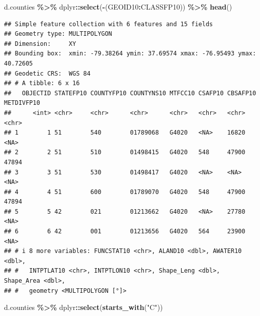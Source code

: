 \documentclass[]{article}
\newenvironment{Shaded}{\begin{snugshade}}{\end{snugshade}}
\newcommand{\FunctionTok}[1]{\textcolor[rgb]{0.13,0.29,0.53}{\textbf{#1}}}
\newcommand{\NormalTok}[1]{#1}
\newcommand{\SpecialCharTok}[1]{\textcolor[rgb]{0.81,0.36,0.00}{\textbf{#1}}}
\newcommand{\StringTok}[1]{\textcolor[rgb]{0.31,0.60,0.02}{#1}}
\begin{document}
\begin{Shaded}
\begin{Highlighting}[]
\NormalTok{d.counties }\SpecialCharTok{\%\textgreater{}\%}\NormalTok{ dplyr}\SpecialCharTok{::}\FunctionTok{select}\NormalTok{(}\SpecialCharTok{{-}}\NormalTok{(GEOID10}\SpecialCharTok{:}\NormalTok{CLASSFP10)) }\SpecialCharTok{\%\textgreater{}\%} \FunctionTok{head}\NormalTok{() }
\end{Highlighting}
\end{Shaded}

\begin{verbatim}
## Simple feature collection with 6 features and 15 fields
## Geometry type: MULTIPOLYGON
## Dimension:     XY
## Bounding box:  xmin: -79.38264 ymin: 37.69574 xmax: -76.95493 ymax: 40.72605
## Geodetic CRS:  WGS 84
## # A tibble: 6 x 16
##   OBJECTID STATEFP10 COUNTYFP10 COUNTYNS10 MTFCC10 CSAFP10 CBSAFP10 METDIVFP10
##      <int> <chr>     <chr>      <chr>      <chr>   <chr>   <chr>    <chr>     
## 1        1 51        540        01789068   G4020   <NA>    16820    <NA>      
## 2        2 51        510        01498415   G4020   548     47900    47894     
## 3        3 51        530        01498417   G4020   <NA>    <NA>     <NA>      
## 4        4 51        600        01789070   G4020   548     47900    47894     
## 5        5 42        021        01213662   G4020   <NA>    27780    <NA>      
## 6        6 42        001        01213656   G4020   564     23900    <NA>      
## # i 8 more variables: FUNCSTAT10 <chr>, ALAND10 <dbl>, AWATER10 <dbl>,
## #   INTPTLAT10 <chr>, INTPTLON10 <chr>, Shape_Leng <dbl>, Shape_Area <dbl>,
## #   geometry <MULTIPOLYGON [°]>
\end{verbatim}

\begin{Shaded}
\begin{Highlighting}[]
\NormalTok{d.counties }\SpecialCharTok{\%\textgreater{}\%}\NormalTok{ dplyr}\SpecialCharTok{::}\FunctionTok{select}\NormalTok{(}\FunctionTok{starts\_with}\NormalTok{(}\StringTok{"C"}\NormalTok{))}
\end{Highlighting}
\end{Shaded}
\end{document}
